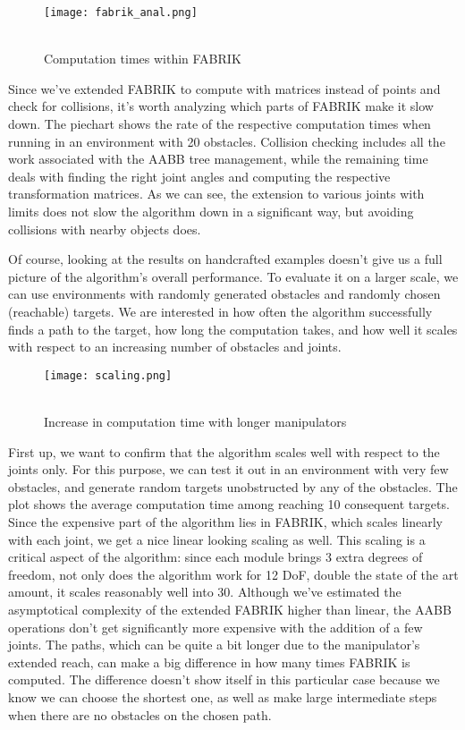 \begin{wrapfigure}{l}{0.4\textwidth}
  \centering
  \texttt{[image: fabrik\_anal.png]}
  \caption{\\Computation times within FABRIK}
\end{wrapfigure}

Since we've extended FABRIK to compute with matrices instead of points and check for collisions, it's worth analyzing which parts of FABRIK make it slow down. The piechart shows the rate of the respective computation times when running in an environment with 20 obstacles. Collision checking includes all the work associated with the AABB tree management, while the remaining time deals with finding the right joint angles and computing the respective transformation matrices. As we can see, the extension to various joints with limits does not slow the algorithm down in a significant way, but avoiding collisions with nearby objects does.

Of course, looking at the results on handcrafted examples doesn't give us a full picture of the algorithm's overall performance. To evaluate it on a larger scale, we can use environments with randomly generated obstacles and randomly chosen (reachable) targets. We are interested in how often the algorithm successfully finds a path to the target, how long the computation takes, and how well it scales with respect to an increasing number of obstacles and joints.

\begin{wrapfigure}{r}{0.4\textwidth}
  \centering
  \texttt{[image: scaling.png]}
  \caption{\\Increase in computation time with longer manipulators}
\end{wrapfigure}

First up, we want to confirm that the algorithm scales well with respect to the joints only. For this purpose, we can test it out in an environment with very few obstacles, and generate random targets unobstructed by any of the obstacles. The plot shows the average computation time among reaching 10 consequent targets. Since the expensive part of the algorithm lies in FABRIK, which scales linearly with each joint, we get a nice linear looking scaling as well. This scaling is a critical aspect of the algorithm: since each module brings 3 extra degrees of freedom, not only does the algorithm work for 12 DoF, double the state of the art amount, it scales reasonably well into 30. Although we've estimated the asymptotical complexity of the extended FABRIK higher than linear, the AABB operations don't get significantly more expensive with the addition of a few joints.
The paths, which can be quite a bit longer due to the manipulator's extended reach, can make a big difference in how many times FABRIK is computed. The difference doesn't show itself in this particular case because we know we can choose the shortest one, as well as make large intermediate steps when there are no obstacles on the chosen path.



